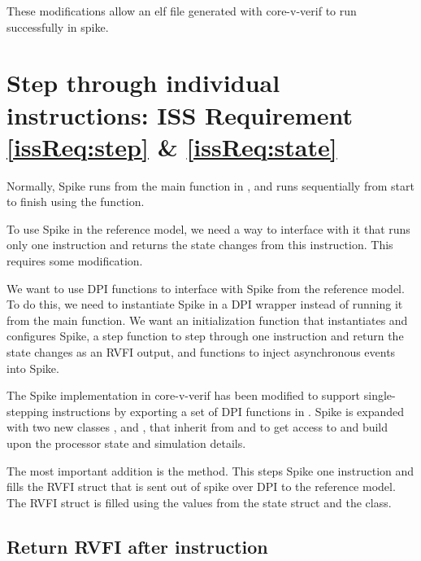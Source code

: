 These modifications allow an elf file generated with core-v-verif to run successfully in spike.


%

\section{Step through individual instructions: ISS Requirement \ref{issReq:step} \& \ref{issReq:state}}


Normally, Spike runs from the main function in , and runs sequentially from start to finish using the  function.

To use Spike in the reference model, we need a way to interface with it that runs only one instruction and returns the state changes from this instruction. This requires some modification. 

We want to use DPI functions to interface with Spike from the reference model. To do this, we need to instantiate Spike in a DPI wrapper instead of running it from the main function. We want an initialization function that instantiates and configures Spike, a step function to step through one instruction and return the state changes as an RVFI output, and functions to inject asynchronous events into Spike.

The Spike implementation in core-v-verif has been modified to support single-stepping instructions by exporting a set of DPI functions in . Spike is expanded with two new classes , and , that inherit from  and  to get access to and build upon the processor state and simulation details.

The most important addition is the  method. This steps Spike one instruction and fills the  RVFI struct that is sent out of spike over DPI to the reference model. The RVFI struct is filled using the values from the  state struct and the  class.



\subsection{Return RVFI after instruction}

